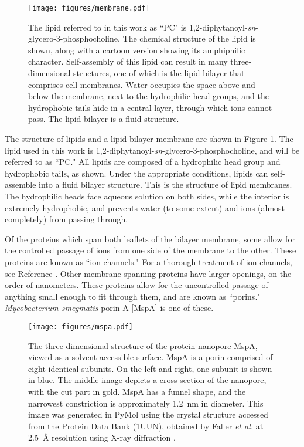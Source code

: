 \begin{figure}[h]
\begin{centering}
\texttt{[image: figures/membrane.pdf]}
\caption[Lipids and the lipid bilayer membrane]{The lipid referred to in this work as ``PC" is 1,2-diphytanoyl-\textit{sn}-glycero-3-phosphocholine.  The chemical structure of the lipid is shown, along with a cartoon version showing its amphiphilic character.  Self-assembly of this lipid can result in many three-dimensional structures, one of which is the lipid bilayer that comprises cell membranes.  Water occupies the space above and below the membrane, next to the hydrophilic head groups, and the hydrophobic tails hide in a central layer, through which ions cannot pass.  The lipid bilayer is a fluid structure.}
\label{fig:lipids}
\end{centering}
\end{figure}

The structure of lipids and a lipid bilayer membrane are shown in Figure \ref{fig:lipids}.  The lipid used in this work is 1,2-diphytanoyl-\textit{sn}-glycero-3-phosphocholine, and will be referred to as ``PC."  All lipids are composed of a hydrophilic head group and hydrophobic tails, as shown.  Under the appropriate conditions, lipids can self-assemble into a fluid bilayer structure.  This is the structure of lipid membranes.  The hydrophilic heads face aqueous solution on both sides, while the interior is extremely hydrophobic, and prevents water (to some extent) and ions (almost completely) from passing through.

Of the proteins which span both leaflets of the bilayer membrane, some allow for the controlled passage of ions from one side of the membrane to the other.  These proteins are known as ``ion channels."  For a thorough treatment of ion channels, see Reference .  Other membrane-spanning proteins have larger openings, on the order of nanometers.  These proteins allow for the uncontrolled passage of anything small enough to fit through them, and are known as ``porins."  \textit{Mycobacterium smegmatis} porin A [MspA] is one of these.

\begin{figure}[h]
\begin{centering}
\texttt{[image: figures/mspa.pdf]}
\caption[The protein nanopore MspA]{The three-dimensional structure of the protein nanopore MspA, viewed as a solvent-accessible surface.  MspA is a porin comprised of eight identical subunits.  On the left and right, one subunit is shown in blue.  The middle image depicts a cross-section of the nanopore, with the cut part in gold.  MspA has a funnel shape, and the narrowest constriction is approximately \SI{1.2}{\nm} in diameter.  This image was generated in PyMol using the crystal structure accessed from the Protein Data Bank (1UUN), obtained by Faller \textit{et al.} at \SI{2.5}{\angstrom} resolution using X-ray diffraction \citep{Faller2004}.}
\label{fig:mspa}
\end{centering}
\end{figure}

